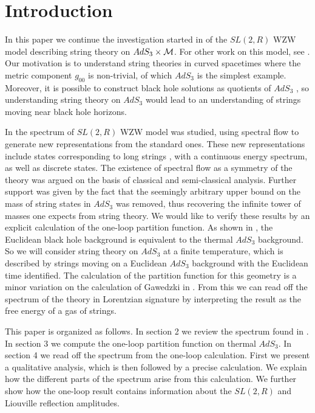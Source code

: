 
\section{Introduction}
\label{intro}

In this paper we continue the investigation started in 
\cite{Maldacena:2000hw}
of the $SL(2,R)$ WZW model describing string theory on 
$AdS_3 \times {\cal M}$. For other work on this model,  
see \cite{list}. 
Our motivation is to understand string theories in 
curved spacetimes where the metric component $g_{00}$
is non-trivial, of which $AdS_3$ is the simplest 
example.  Moreover, it is possible to construct black hole 
solutions as quotients of $AdS_3$ \cite{btz}, so understanding 
string theory on $AdS_3$ would lead to an understanding of 
strings moving near black hole horizons. 

In \cite{Maldacena:2000hw} the spectrum
 of $SL(2,R)$ WZW model was studied, using 
spectral flow to generate new representations from the standard 
ones.  These new representations include states corresponding
to long strings \cite{Maldacena:1998uz,Seiberg:1999xz},
 with a continuous energy spectrum, as well as
discrete states.  The existence of spectral flow as a symmetry of the 
theory was argued on the basis of classical and semi-classical analysis.
Further support was given by the fact that the seemingly arbitrary 
upper bound on the mass of string states in $AdS_3$ was removed,
thus recovering the infinite tower of masses one expects from string 
theory.  We would like to verify these results by an explicit 
calculation of the one-loop partition function. 
As shown in  \cite{malda}, the Euclidean black hole background is 
equivalent to the thermal $AdS_3$ background. 
So we will consider string theory on $AdS_3$ at a finite temperature, 
which is described by strings moving on a Euclidean $AdS_3$ background
with the Euclidean time identified. 
The calculation of the partition function for this geometry is a 
minor variation on the calculation of
Gawedzki in \cite{Gawedzki:1991yu}. From 
this we can read off the spectrum of the theory
in Lorentzian signature by interpreting the result as the
free energy of a gas of strings.

This paper is organized as follows.
In section 2 we review the spectrum found in \cite{Maldacena:2000hw}.
In section 3 we compute the one-loop partition function on thermal 
$AdS_3$. In section 4 we read off the spectrum from the one-loop
calculation. First we present a qualitative analysis, which is then
followed by a precise calculation. We explain how the different parts
of the spectrum arise from this calculation. We further show how
the one-loop result contains information about the 
$SL(2,R)$ and Liouville reflection amplitudes.


